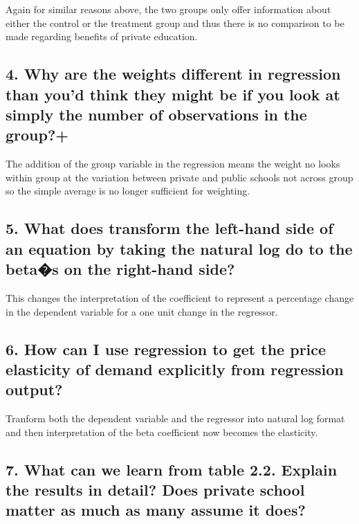 \documentclass[
]{article}
\begin{document}
Again for similar reasons above, the two groups only offer information
about either the control or the treatment group and thus there is no
comparison to be made regarding benefits of private education.

\subsection{4. Why are the weights different in regression than you'd
think they might be if you look at simply the number of observations in
the
group?+}\label{why-are-the-weights-different-in-regression-than-youd-think-they-might-be-if-you-look-at-simply-the-number-of-observations-in-the-group}

The addition of the group variable in the regression means the weight no
looks within group at the variation between private and public schools
not across group so the simple average is no longer sufficient for
weighting.

\subsection{5. What does transform the left-hand side of an equation by
taking the natural log do to the beta�s on the right-hand
side?}\label{what-does-transform-the-left-hand-side-of-an-equation-by-taking-the-natural-log-do-to-the-betas-on-the-right-hand-side}

This changes the interpretation of the coefficient to represent a
percentage change in the dependent variable for a one unit change in the
regressor.

\subsection{6. How can I use regression to get the price elasticity of
demand explicitly from regression
output?}\label{how-can-i-use-regression-to-get-the-price-elasticity-of-demand-explicitly-from-regression-output}

Tranform both the dependent variable and the regressor into natural log
format and then interpretation of the beta coefficient now becomes the
elasticity.

\subsection{7. What can we learn from table 2.2. Explain the results in
detail? Does private school matter as much as many assume it
does?}\label{what-can-we-learn-from-table-2.2.-explain-the-results-in-detail-does-private-school-matter-as-much-as-many-assume-it-does}
\end{document}
